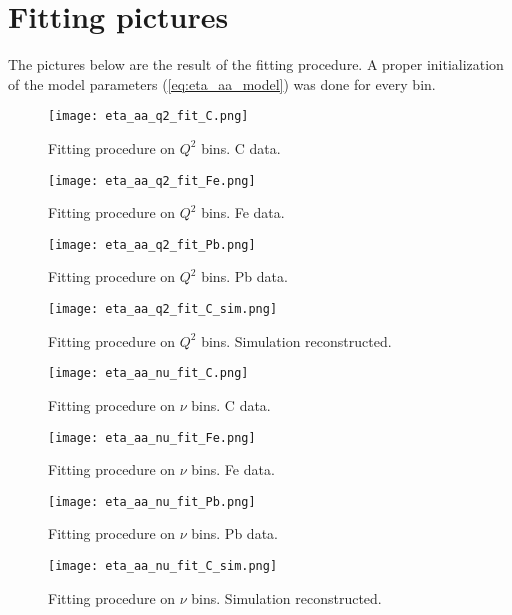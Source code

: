 \section{Fitting pictures}
\label{sec:fitting_pics}
The pictures below are the result of the fitting procedure. A proper initialization of the model parameters (\eqref{eq:eta_aa_model}) was done for every bin.
 
\begin{landscape}
\begin{figure}[H]
\centering
\texttt{[image: eta\_aa\_q2\_fit\_C.png]}
\caption{Fitting procedure on $Q^2$ bins. C data.}
\label{fig:eta_aa_q2_fit_C}
\end{figure}

%
\begin{figure}[H]
\centering
\texttt{[image: eta\_aa\_q2\_fit\_Fe.png]}
\caption{Fitting procedure on $Q^2$ bins. Fe data.}
\label{fig:eta_aa_q2_fit_Fe}
\end{figure}
%
\begin{figure}[H]
\centering
\texttt{[image: eta\_aa\_q2\_fit\_Pb.png]}
\caption{Fitting procedure on $Q^2$ bins. Pb data.}
\label{fig:eta_aa_q2_fit_Pb}
\end{figure}
%
\begin{figure}[H]
\centering
\texttt{[image: eta\_aa\_q2\_fit\_C\_sim.png]}
\caption{Fitting procedure on $Q^2$ bins. Simulation reconstructed.}
\label{fig:eta_aa_q2_fit_sim}
\end{figure}

\begin{figure}[H]
\centering
\texttt{[image: eta\_aa\_nu\_fit\_C.png]}
\caption{Fitting procedure on $\nu$ bins. C data.}
\label{fig:eta_aa_nu_fit_C}
\end{figure}

%
\begin{figure}[H]
\centering
\texttt{[image: eta\_aa\_nu\_fit\_Fe.png]}
\caption{Fitting procedure on $\nu$ bins. Fe data.}
\label{fig:eta_aa_nu_fit_Fe}
\end{figure}
%
\begin{figure}[H]
\centering
\texttt{[image: eta\_aa\_nu\_fit\_Pb.png]}
\caption{Fitting procedure on $\nu$ bins. Pb data.}
\label{fig:eta_aa_nu_fit_Pb}
\end{figure}
%
\begin{figure}[H]
\centering
\texttt{[image: eta\_aa\_nu\_fit\_C\_sim.png]}
\caption{Fitting procedure on $\nu$ bins. Simulation reconstructed.}
\label{fig:eta_aa_nu_fit_sim}
\end{figure}



\end{landscape}
